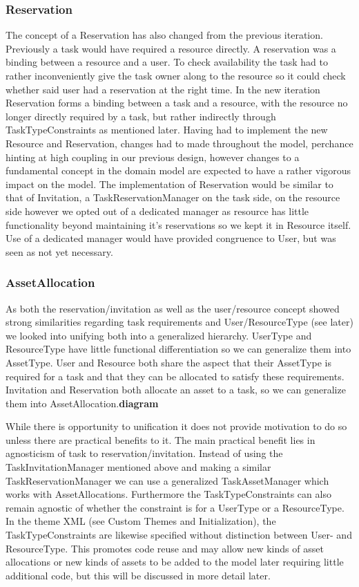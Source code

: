 			\subsubsection{Reservation}
				The concept of a Reservation has also changed from the previous iteration. Previously a task would have required a resource directly. A reservation was a binding between a resource and a user. To check availability the task had to rather inconveniently give the task owner along to the resource so it could check whether said user had a reservation at the right time. In the new iteration Reservation forms a binding between a task and a resource, with the resource no longer directly required by a task, but rather indirectly through TaskTypeConstraints as mentioned later. Having had to implement the new Resource and Reservation, changes had to made throughout the model, perchance hinting at high coupling in our previous design, however changes to a fundamental concept in the domain model are expected to have a rather vigorous impact on the model. The implementation of Reservation would be similar to that of Invitation, a TaskReservationManager on the task side, on the resource side however we opted out of a dedicated manager as resource has little functionality beyond maintaining it's reservations so we kept it in Resource itself. Use of a dedicated manager would have provided congruence to User, but was seen as not yet necessary. 
			
			\subsubsection{AssetAllocation}
				As both the reservation/invitation as well as the user/resource concept showed strong similarities regarding task requirements and User/ResourceType (see later) we looked into unifying both into a generalized hierarchy. UserType and ResourceType have little functional differentiation so we can generalize them into AssetType. User and Resource both share the aspect that their AssetType is required for a task and that they can be allocated to satisfy these requirements. Invitation and Reservation both allocate an asset to a task, so we can generalize them into AssetAllocation.\textbf{diagram}
				
				While there is opportunity to unification it does not provide motivation to do so unless there are practical benefits to it. The main practical benefit lies in agnosticism of task to reservation/invitation. Instead of using the TaskInvitationManager mentioned above and making a similar TaskReservationManager we can use a generalized TaskAssetManager which works with AssetAllocations. Furthermore the TaskTypeConstraints can also remain agnostic of whether the constraint is for a UserType or a ResourceType. In the theme XML (see Custom Themes and Initialization), the TaskTypeConstraints are likewise specified without distinction between User- and ResourceType. This promotes code reuse and may allow new kinds of asset allocations or new kinds of assets to be added to the model later requiring little additional code, but this will be discussed in more detail later.
				
